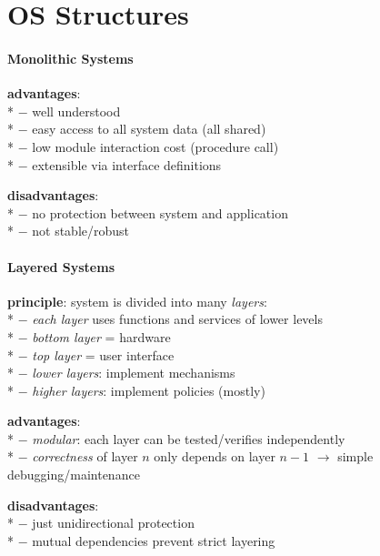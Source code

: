 \section{OS Structures}

\paragraph{Monolithic Systems}
\begin{items}
  \item \textbf{advantages}: \\*
    $ - $ well understood \\*
    $ - $ easy access to all system data (all shared) \\*
    $ - $ low module interaction cost (procedure call) \\*
    $ - $ extensible via interface definitions
  \item \textbf{disadvantages}: \\*
    $ - $ no protection between system and application \\*
    $ - $ not stable/robust
\end{items}

\paragraph{Layered Systems}
\begin{items}
  \item \textbf{principle}: system is divided into many \emph{layers}: \\*
    $ - $ \emph{each layer} uses functions and services of lower levels \\*
    $ - $ \emph{bottom layer} = hardware \\*
    $ - $ \emph{top layer} = user interface \\*
    $ - $ \emph{lower layers}: implement mechanisms \\*
    $ - $ \emph{higher layers}: implement policies (mostly)
  \item \textbf{advantages}: \\*
    $ - $ \emph{modular}: each layer can be tested/verifies independently \\*
    $ - $ \emph{correctness} of layer $ n $ only depends on layer $ n-1 $ $ \to $ simple debugging/maintenance
  \item \textbf{disadvantages}: \\*
    $ - $ just unidirectional protection \\*
    $ - $ mutual dependencies prevent strict layering
\end{items}

